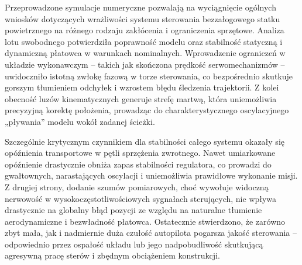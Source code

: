 \akapit Przeprowadzone symulacje numeryczne pozwalają na wyciągnięcie ogólnych wniosków dotyczących wrażliwości systemu sterowania bezzałogowego statku powietrznego na różnego rodzaju zakłócenia i ograniczenia sprzętowe. Analiza lotu swobodnego potwierdziła poprawność modelu oraz stabilność statyczną i dynamiczną płatowca w warunkach nominalnych. Wprowadzenie ograniczeń w układzie wykonawczym – takich jak skończona prędkość serwomechanizmów – uwidoczniło istotną zwłokę fazową w torze sterowania, co bezpośrednio skutkuje gorszym tłumieniem odchyłek i wzrostem błędu śledzenia trajektorii. Z kolei obecność luzów kinematycznych generuje strefę martwą, która uniemożliwia precyzyjną korektę położenia, prowadząc do charakterystycznego oscylacyjnego „pływania” modelu wokół zadanej ścieżki.

\akapit Szczególnie krytycznym czynnikiem dla stabilności całego systemu okazały się opóźnienia transportowe w pętli sprzężenia zwrotnego. Nawet umiarkowane opóźnienie drastycznie obniża zapas stabilności regulatora, co prowadzi do gwałtownych, narastających oscylacji i uniemożliwia prawidłowe wykonanie misji. Z drugiej strony, dodanie szumów pomiarowych, choć wywołuje widoczną nerwowość w wysokoczęstotliwościowych sygnałach sterujących, nie wpływa drastycznie na globalny błąd pozycji ze względu na naturalne tłumienie aerodynamiczne i bezwładność płatowca. Ostatecznie stwierdzono, że zarówno zbyt mała, jak i nadmiernie duża czułość autopilota pogarsza jakość sterowania – odpowiednio przez ospałość układu lub jego nadpobudliwość skutkującą agresywną pracę sterów i zbędnym obciążeniem konstrukcji.

